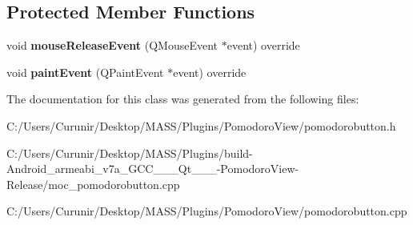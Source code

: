 \subsection*{Protected Member Functions}
\begin{DoxyCompactItemize}
\item 
\mbox{\label{class_pomodoro_button_a75802646c43d4f9ffd4d7e5b4c20be8b}} 
void {\bfseries mouse\+Release\+Event} (Q\+Mouse\+Event $\ast$event) override
\item 
\mbox{\label{class_pomodoro_button_afb688dd2937945dd444a63999ef69ece}} 
void {\bfseries paint\+Event} (Q\+Paint\+Event $\ast$event) override
\end{DoxyCompactItemize}


The documentation for this class was generated from the following files\+:\begin{DoxyCompactItemize}
\item 
C\+:/\+Users/\+Curunir/\+Desktop/\+M\+A\+S\+S/\+Plugins/\+Pomodoro\+View/pomodorobutton.\+h\item 
C\+:/\+Users/\+Curunir/\+Desktop/\+M\+A\+S\+S/\+Plugins/build-\/\+Android\+\_\+armeabi\+\_\+v7a\+\_\+\+G\+C\+C\+\_\+\_\+\_\+\+Qt\+\_\+\_\+\_-\/\+Pomodoro\+View-\/\+Release/moc\+\_\+pomodorobutton.\+cpp\item 
C\+:/\+Users/\+Curunir/\+Desktop/\+M\+A\+S\+S/\+Plugins/\+Pomodoro\+View/pomodorobutton.\+cpp\end{DoxyCompactItemize}
